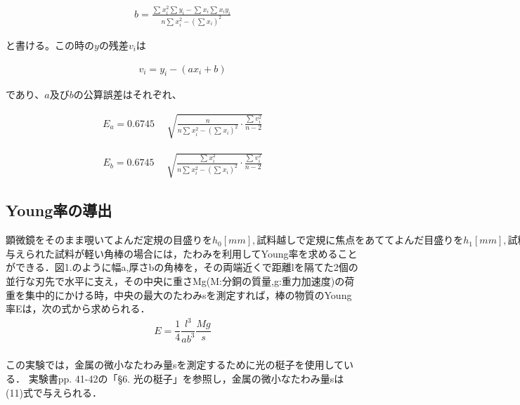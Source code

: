 \documentclass[a4paper,1pt]{jsarticle}
\begin{document}
      \begin{eqnarray}
        \label{kaisekiB}
        b=\frac{\sum{}^{}x_i^2 \sum{}^{}y_i-\sum{}^{}x_i \sum{}^{}x_iy_i}{n\sum{}^{}x_i^2-(\sum{}^{}x_i)^2}
      \end{eqnarray}

      と書ける。この時の$y$の残差$v_i$は

      \begin{eqnarray}
        \label{kaisekizansa}
        v_i=y_i-(ax_i+b)
      \end{eqnarray}

      であり、$a$及び$b$の公算誤差はそれぞれ、

  
      \begin{eqnarray}
        \label{kaisekigosaA}
        E_a=0.6745\quad\sqrt[]{\frac{n}{n\sum{}^{}x_i^2 - (\sum{}^{}x_i)^2}\cdot\frac{\sum{}^{}v_i^2}{n-2}}
      \end{eqnarray}

      \begin{eqnarray}
        \label{kaisekigosaB}
        E_b=0.6745\quad\sqrt[]{\frac{\sum{}^{}x_i^2}{n\sum{}^{}x_i^2 - (\sum{}^{}x_i)^2}\cdot\frac{\sum{}^{}v_i^2}{n-2}}
      \end{eqnarray}

  \subsection*{Young率の導出}
  $顕微鏡をそのまま覗いてよんだ定規の目盛りをh_0[mm],試料越しで定規に焦点をあててよんだ目盛りをh_1[mm],試料の傷に焦点をあててよんだ目盛りをh_2[mm]とすると，$\\

  与えられた試料が軽い角棒の場合には，たわみを利用してYoung率を求めることができる．図1.のように幅a,厚さbの角棒を，その両端近くで距離lを隔てた2個の並行な刃先で水平に支え，その中央に重さMg(M:分銅の質量,g:重力加速度)の荷重を集中的にかける時，中央の最大のたわみsを測定すれば，棒の物質のYoung率Eは，次の式から求められる．\\

  \begin{eqnarray}
    \label{Young}
    E=\dfrac{1}{4}\dfrac{l^3}{ab^3}\dfrac{Mg}{s}
  \end{eqnarray}
\\
 
この実験では，金属の微小なたわみ量sを測定するために光の梃子を使用している． 実験書pp. 41-42の「{\S}6. 光の梃子」を参照し，金属の微小なたわみ量sは(11)式で与えられる．
\end{document}
